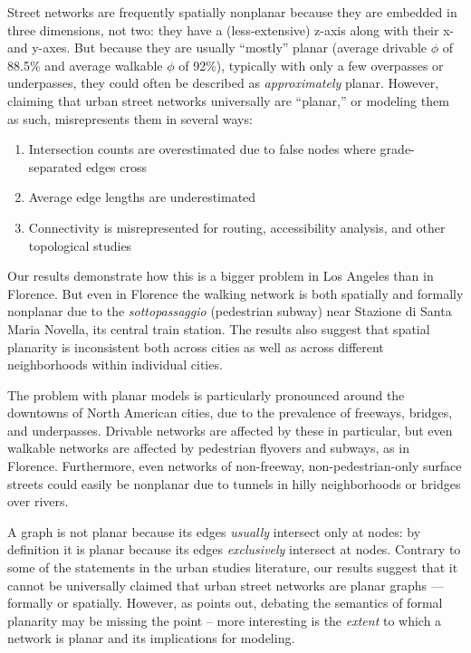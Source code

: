 \documentclass[Afour,sageh,times]{sagej}
\begin{document}
Street networks are frequently spatially nonplanar because they are embedded in three dimensions, not two: they have a (less-extensive) z-axis along with their x- and y-axes. But because they are usually \enquote{mostly} planar (average drivable $\phi$ of 88.5\% and average walkable $\phi$ of 92\%), typically with only a few overpasses or underpasses, they could often be described as \emph{approximately} planar. However, claiming that urban street networks universally are \enquote{planar,} or modeling them as such, misrepresents them in several ways:

\begin{enumerate}
	\item{Intersection counts are overestimated due to false nodes where grade-separated edges cross}
	\item{Average edge lengths are underestimated}
	\item{Connectivity is misrepresented for routing, accessibility analysis, and other topological studies}
\end{enumerate}

Our results demonstrate how this is a bigger problem in Los Angeles than in Florence. But even in Florence the walking network is both spatially and formally nonplanar due to the \textit{sottopassaggio} (pedestrian subway) near Stazione di Santa Maria Novella, its central train station. The results also suggest that spatial planarity is inconsistent both across cities as well as across different neighborhoods within individual cities.

The problem with planar models is particularly pronounced around the downtowns of North American cities, due to the prevalence of freeways, bridges, and underpasses. Drivable networks are affected by these in particular, but even walkable networks are affected by pedestrian flyovers and subways, as in Florence. Furthermore, even networks of non-freeway, non-pedestrian-only surface streets could easily be nonplanar due to tunnels in hilly neighborhoods or bridges over rivers.

A graph is not planar because its edges \emph{usually} intersect only at nodes: by definition it is planar because its edges \emph{exclusively} intersect at nodes. Contrary to some of the statements in the urban studies literature, our results suggest that it cannot be universally claimed that urban street networks are planar graphs --- formally or spatially. However, as \citet{newman_networks:_2010} points out, debating the semantics of formal planarity may be missing the point -- more interesting is the \emph{extent} to which a network is planar and its implications for modeling.
\end{document}
